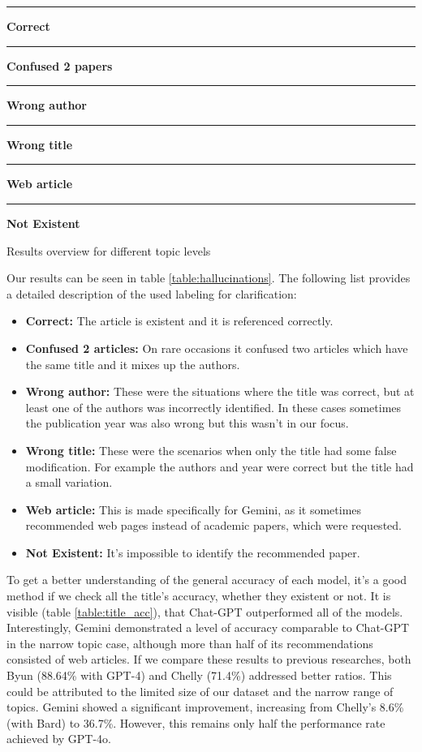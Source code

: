 \documentclass[runningheads]{llncs}
\begin{document}
\begin{table}[!h]
\parbox{\textwidth}{
    \centering
    \textcolor{green}{\rule{10pt}{10pt}} \textbf{Correct} \quad
    \textcolor{blue}{\rule{10pt}{10pt}} \textbf{Confused 2 papers} \quad
    \textcolor{orange}{\rule{10pt}{10pt}} \textbf{Wrong author} \quad
    \\
    \textcolor{yellow}{\rule{10pt}{10pt}} \textbf{Wrong title} \quad
    \textcolor{pink}{\rule{10pt}{10pt}} \textbf{Web article} \quad
    \textcolor{red}{\rule{10pt}{10pt}} \textbf{Not Existent}
}
\caption{Results overview for different topic levels}
\label{table:hallucinations}
\end{table}

Our results can be seen in table \ref{table:hallucinations}. The following list provides a detailed description of the used labeling for clarification:

\begin{itemize}
    \item \textbf{Correct:} The article is existent and it is referenced correctly.
    \item \textbf{Confused 2 articles:} On rare occasions it confused two articles which have the same title and it mixes up the authors.
    \item \textbf{Wrong author:} These were the situations where the title was correct, but at least one of the authors was incorrectly identified. In these cases sometimes the publication year was also wrong but this wasn't in our focus.
    \item \textbf{Wrong title:} These were the scenarios when only the title had some false modification. For example the authors and year were correct but the title had a small variation.
    \item \textbf{Web article:} This is made specifically for Gemini, as it sometimes recommended web pages instead of academic papers, which were requested.
    \item \textbf{Not Existent:} It's impossible to identify the recommended paper.
\end{itemize}

To get a better understanding of the general accuracy of each model, it's a good method if we check all the title's accuracy, whether they existent or not. It is visible (table \ref{table:title_acc}), that Chat-GPT outperformed all of the models. Interestingly, Gemini demonstrated a level of accuracy comparable to Chat-GPT in the narrow topic case, although more than half of its recommendations consisted of web articles. If we compare these results to previous researches, both Byun (88.64\% with GPT-4) and Chelly (71.4\%) addressed better ratios. This could be attributed to the limited size of our dataset and the narrow range of topics. Gemini showed a significant improvement, increasing from Chelly’s 8.6\% (with Bard) to 36.7\%. However, this remains only half the performance rate achieved by GPT-4o.
\end{document}
